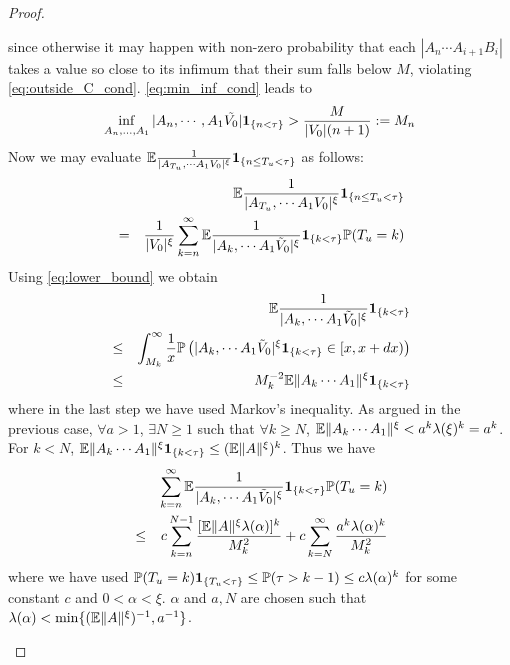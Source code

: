 \documentclass{article}
\begin{document}
\begin{proof}
\begin{enumerate}
    since otherwise it may happen with non-zero probability that each
    $|A_n \cdots A_{i+1} B_i|$ takes a value so close to its infimum
    that their sum falls below $M$, violating
    \eqref{eq:outside_C_cond}. \eqref{eq:min_inf_cond} leads to
    \begin{equation}
      \inf_{A_n, \dots, A_1}|A_n, \cdots, A_1 \tilde{V_0}| \mathbf{1}_{\{n < \tau\}}
      > {M \over |V_0| (n+1)} := M_n \label{eq:lower_bound}
    \end{equation}
    Now we may evaluate $\mathbb{E} {1 \over |A_{T_u}, \cdots A_1
      V_0|^{\xi}}\mathbf{1}_{\{n \leq T_u < \tau\}}$ as
    follows:
    \begin{eqnarray*}
      && \mathbb{E} {1 \over |A_{T_u}, \cdots A_1 V_0|^\xi} \mathbf{1}_{\{n \leq T_u < \tau\}}\\
      &=& {1 \over |V_0|^{\xi}} \sum_{k=n}^\infty \mathbb{E} {1 \over |A_k,
        \cdots A_1 \tilde V_0|^{\xi}} \mathbf{1}_{\{k < \tau\}} \mathbb{P}(T_u = k)
    \end{eqnarray*}
    Using \eqref{eq:lower_bound} we obtain
    \begin{eqnarray*}
      && \mathbb{E} {1 \over |A_k, \cdots A_1 \tilde V_0|^{\xi}} \mathbf{1}_{\{k < \tau\}} \\
      &\leq& \int_{M_k}^\infty {1 \over x} \mathbb{P}\left(
        |A_k, \cdots A_1 \tilde V_0|^{\xi}\mathbf{1}_{\{k < \tau\}} \in [x, x+ dx)
      \right) \\
      &\leq& M_k^{-2} \mathbb{E} \|A_k \cdots A_1\|^\xi \mathbf{1}_{\{k < \tau\}}
    \end{eqnarray*}
    where in the last step we have used Markov's inequality. As argued
    in the previous case, $\forall a > 1$, $\exists N \geq 1$ such
    that $\forall k \geq N$, $\mathbb{E} \|A_k \cdots A_1\|^\xi < a^k
    \lambda(\xi)^k = a^k$. For $k < N$, $\mathbb{E} \|A_k \cdots A_1\|^\xi
    \mathbf{1}_{\{k < \tau\}} \leq (\mathbb{E}\|A\|^\xi)^k$. Thus we have
    \begin{eqnarray*}
      && \sum_{k=n}^\infty \mathbb{E} {1 \over |A_k, \cdots A_1 \tilde
        V_0|^{\xi}} \mathbf{1}_{\{k < \tau\}} \mathbb{P}(T_u = k) \\
      &\leq& c \sum_{k=n}^{N-1} {
        [\mathbb{E} \|A\|^\xi \lambda(\alpha)]^k
        \over M_k^2
      } + c \sum_{k=N}^\infty {
        a^k \lambda(\alpha)^k
        \over M_k^2
      }
    \end{eqnarray*}
    where we have used $\mathbb{P}(T_u = k)\mathbf{1}_{\{T_u < \tau\}} \leq \mathbb{P}(\tau > k-1)
    \leq c \lambda(\alpha)^k$ for some constant $c$ and $0 < \alpha <
    \xi$. $\alpha$ and $a, N$ are chosen such that $\lambda(\alpha) < \min\{(\mathbb{E}
    \|A\|^\xi)^{-1}, a^{-1}\}$.
  \end{enumerate}
\end{proof}




\end{document}
